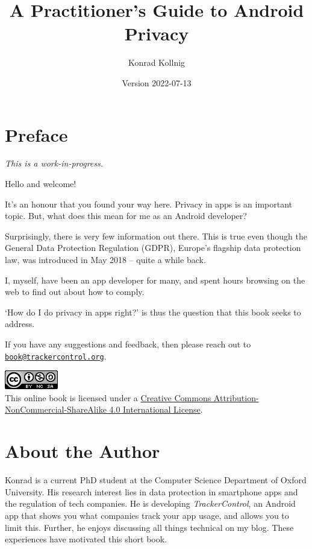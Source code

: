 \documentclass[
]{book}
\title{A Practitioner's Guide to Android Privacy}
\author{Konrad Kollnig}
\date{Version 2022-07-13}
\begin{document}
\maketitle

{
\setcounter{tocdepth}{1}
\tableofcontents
}
\hypertarget{preface}{%
\chapter*{Preface}\label{preface}}

\emph{This is a work-in-progress.}

Hello and welcome!

It's an honour that you found your way here. Privacy in apps is an important topic. But, what does this mean for me as an Android developer?

Surprisingly, there is very few information out there. This is true even though the General Data Protection Regulation (GDPR), Europe's flagship data protection law, was introduced in May 2018 -- quite a while back.

I, myself, have been an app developer for many, and spent hours browsing on the web to find out about how to comply.

`How do I do privacy in apps right?' is thus the question that this book seeks to address.

If you have any suggestions and feedback, then please reach out to \href{mailto:book@trackercontrol.org}{\nolinkurl{book@trackercontrol.org}}.

\includegraphics{images/by-nc-sa.png}\\
This online book is licensed under a \href{http://creativecommons.org/licenses/by-nc-sa/4.0/}{Creative Commons Attribution-NonCommercial-ShareAlike 4.0 International License}.

\hypertarget{about-the-author}{%
\chapter*{About the Author}\label{about-the-author}}

Konrad is a current PhD student at the Computer Science Department of Oxford University. His research interest lies in data protection in smartphone apps and the regulation of tech companies. He is developing \emph{TrackerControl}, an Android app that shows you what companies track your app usage, and allows you to limit this. Further, he enjoys discussing all things technical on my blog. These experiences have motivated this short book.
\end{document}
